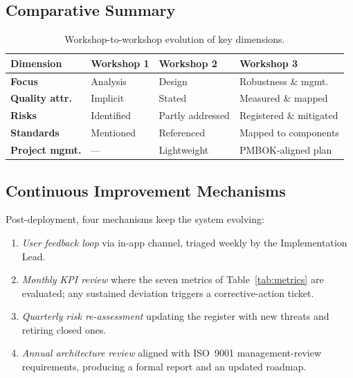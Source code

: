 \documentclass[conference,a4paper,10pt]{IEEEtran}
\begin{document}
\subsection{Comparative Summary}

\begin{table}[H]
\centering
\caption{Workshop-to-workshop evolution of key dimensions.}
\label{tab:evolution}
\renewcommand{\arraystretch}{1.2}
\footnotesize
\begin{tabularx}{\columnwidth}{>{\bfseries}l X X X}
\toprule
\rowcolor{tableheader} Dimension & Workshop 1 & Workshop 2 & Workshop 3 \\
\midrule
Focus           & Analysis        & Design          & Robustness \& mgmt. \\
Quality attr.\  & Implicit        & Stated          & Measured \& mapped \\
Risks           & Identified      & Partly addressed& Registered \& mitigated \\
Standards       & Mentioned       & Referenced      & Mapped to components \\
Project mgmt.   & ---             & Lightweight     & PMBOK-aligned plan \\
\bottomrule
\end{tabularx}
\end{table}

\subsection{Continuous Improvement Mechanisms}

Post-deployment, four mechanisms keep the system evolving:

\begin{enumerate}[leftmargin=*]
  \item \emph{User feedback loop} via in-app channel, triaged weekly by
  the Implementation Lead.
  \item \emph{Monthly KPI review} where the seven metrics of
  Table~\ref{tab:metrics} are evaluated; any sustained deviation triggers
  a corrective-action ticket.
  \item \emph{Quarterly risk re-assessment} updating the register with
  new threats and retiring closed ones.
  \item \emph{Annual architecture review} aligned with ISO~9001
  management-review requirements, producing a formal report and an
  updated roadmap.
\end{enumerate}
\end{document}
